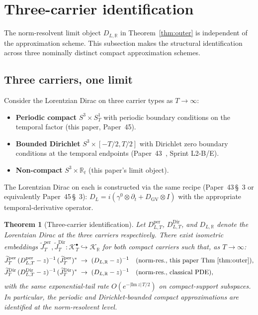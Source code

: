 \documentclass[11pt,a4paper]{article}
\theoremstyle{plain}
\newtheorem{theorem}{Theorem}[section]
\theoremstyle{definition}
\newcommand{\sthree}{S^{3}}
\newcommand{\SoneT}{S^{1}_{T}}
\newcommand{\Krein}{\mathcal{K}}
\newcommand{\R}{\mathbb{R}}
\newcommand{\DGV}{D_{\mathrm{GV}}}
\newcommand{\DL}{D_{L}}
\newcommand{\DLR}{D_{L,\R}}
\newcommand{\JT}{\widetilde{J}_{T}}
\begin{document}
\section{Three-carrier identification}\label{sec:three_carriers}

The norm-resolvent limit object $\DLR$ in
Theorem~\ref{thm:outer} is independent of the approximation scheme.
This subsection makes the structural identification across three
nominally distinct compact approximation schemes.

\subsection{Three carriers, one limit}\label{sec:three_carriers_one_limit}

Consider the Lorentzian Dirac on three carrier types as $T \to \infty$:
\begin{itemize}
\item \textbf{Periodic compact} $\sthree \times \SoneT$ with periodic
boundary conditions on the temporal factor (this paper, Paper~45).
\item \textbf{Bounded Dirichlet} $\sthree \times [-T/2, T/2]$ with
Dirichlet zero boundary conditions at the temporal endpoints
(Paper~43~\cite{paper43}, Sprint L2-B/E).
\item \textbf{Non-compact} $\sthree \times \R_{t}$ (this paper's limit
object).
\end{itemize}

The Lorentzian Dirac on each is constructed via the same recipe
(Paper~43\,\S~3 or equivalently Paper~45\,\S~3):
$\DL = i(\gamma^{0}\otimes\partial_{t} + \DGV \otimes I)$ with the
appropriate temporal-derivative operator.

\begin{theorem}[Three-carrier identification]\label{thm:three_carriers}
Let $D_{L,T}^{\mathrm{per}}$, $D_{L,T}^{\mathrm{Dir}}$, and $\DLR$
denote the Lorentzian Dirac at the three carriers respectively. There
exist isometric embeddings $\JT^{\mathrm{per}}, \JT^{\mathrm{Dir}}
: \Krein_{T}^{\bullet} \hookrightarrow \Krein_{\R}$ for both compact
carriers such that, as $T \to \infty$:
\begin{align}
\JT^{\mathrm{per}}\,(D_{L,T}^{\mathrm{per}} - z)^{-1}\,
(\JT^{\mathrm{per}})^{*}
&\;\to\; (\DLR - z)^{-1} && \text{(norm-res., this paper Thm~\ref{thm:outer})},
\label{eq:per_limit}\\
\JT^{\mathrm{Dir}}\,(D_{L,T}^{\mathrm{Dir}} - z)^{-1}\,
(\JT^{\mathrm{Dir}})^{*}
&\;\to\; (\DLR - z)^{-1} && \text{(norm-res., classical PDE)},
\label{eq:Dir_limit}
\end{align}
with the same exponential-tail rate $O(e^{-|\mathrm{Im}\,z|\,T/2})$ on
compact-support subspaces. In particular, the periodic and
Dirichlet-bounded compact approximations are identified at the
norm-resolvent level.
\end{theorem}
\end{document}
